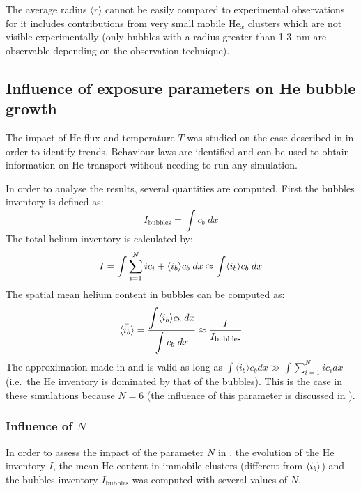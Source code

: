 The average radius $\langle r \rangle$ cannot be easily compared to experimental observations for it includes contributions from very small mobile He$_x$ clusters which are not visible experimentally (only bubbles with a radius greater than 1-\SI{3}{nm} are observable depending on the observation technique).

\subsection{Influence of exposure parameters on He bubble growth}
The impact of He flux and temperature $T$ was studied on the case described in  in order to identify trends.
Behaviour laws are identified and can be used to obtain information on He transport without needing to run any simulation.

In order to analyse the results, several quantities are computed.
First the bubbles inventory is defined as:
\begin{equation}
    I_\mathrm{bubbles}= \displaystyle \int c_b \; dx
\end{equation}
The total helium inventory is calculated by:
\begin{equation}
        I = \displaystyle \int \sum\limits_{i=1}^N i c_i + \langle i_b \rangle c_b \; dx
        \approx \displaystyle \int \langle i_b \rangle c_b \; dx
    \labeq{I}
\end{equation}
The spatial mean helium content in bubbles can be computed as:
\begin{equation}
        \Bar{\langle i_b \rangle} = \frac{\displaystyle \int \langle i_b \rangle c_b \; dx}{\displaystyle \int c_b \; dx}
        \approx \frac{I}{I_\mathrm{bubbles}}
    \labeq{mean ib}
\end{equation}
The approximation made in  and  is valid as long as $\int \langle i_b \rangle c_b dx \gg  \int \sum\limits_{i=1}^N i c_i dx$ (i.e.\ the He inventory is dominated by that of the bubbles).
This is the case in these simulations because $N=6$ (the influence of this parameter is discussed in ).

\subsubsection{Influence of $N$} 
In order to assess the impact of the parameter $N$ in , the evolution of the He inventory $I$, the mean He content in immobile clusters (different from $\Bar{\langle i_b \rangle}$) and the bubbles inventory $I_\mathrm{bubbles}$ was computed with several values of $N$.

